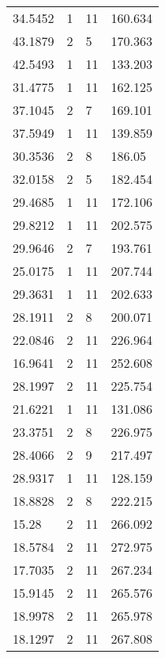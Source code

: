 \documentclass[bwprint]{gmcmthesis}
\begin{document}
\begin{longtable}[c]{llll}
34.5452   & 1           & 11          & 160.634   \\
43.1879   & 2           & 5           & 170.363   \\
42.5493   & 1           & 11          & 133.203   \\
31.4775   & 1           & 11          & 162.125   \\
37.1045   & 2           & 7           & 169.101   \\
37.5949   & 1           & 11          & 139.859   \\
30.3536   & 2           & 8           & 186.05    \\
32.0158   & 2           & 5           & 182.454   \\
29.4685   & 1           & 11          & 172.106   \\
29.8212   & 1           & 11          & 202.575   \\
29.9646   & 2           & 7           & 193.761   \\
25.0175   & 1           & 11          & 207.744   \\
29.3631   & 1           & 11          & 202.633   \\
28.1911   & 2           & 8           & 200.071   \\
22.0846   & 2           & 11          & 226.964   \\
16.9641   & 2           & 11          & 252.608   \\
28.1997   & 2           & 11          & 225.754   \\
21.6221   & 1           & 11          & 131.086   \\
23.3751   & 2           & 8           & 226.975   \\
28.4066   & 2           & 9           & 217.497   \\
28.9317   & 1           & 11          & 128.159   \\
18.8828   & 2           & 8           & 222.215   \\
15.28     & 2           & 11          & 266.092   \\
18.5784   & 2           & 11          & 272.975   \\
17.7035   & 2           & 11          & 267.234   \\
15.9145   & 2           & 11          & 265.576   \\
18.9978   & 2           & 11          & 265.978   \\
18.1297   & 2           & 11          & 267.808   \\

\end{longtable}
\end{document}
